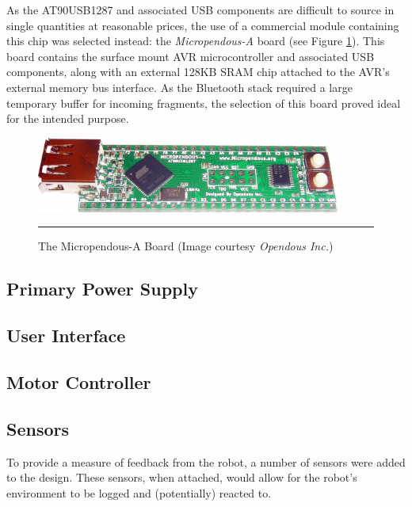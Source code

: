 As the AT90USB1287 and associated USB components are difficult to source in single quantities at reasonable prices, the use of a commercial module containing this chip was selected instead: the \textit{Micropendous-A} board (see Figure \ref{fig:micropendous}). This board contains the surface mount AVR microcontroller and associated USB components, along with an external 128KB SRAM chip attached to the AVR's external memory bus interface. As the Bluetooth stack required a large temporary buffer for incoming fragments, the selection of this board proved ideal for the intended purpose.

\begin{figure}
	\centering
		\includegraphics[width=100mm]{./Figures/MicropendousA.jpg}
	\rule{35em}{0.5pt}
	\caption[Micropendous-A Board]{The Micropendous-A Board (Image courtesy \textit{Opendous Inc.})}
	\label{fig:micropendous}
\end{figure}

\subsection{Primary Power Supply}


\subsection{User Interface}


\subsection{Motor Controller}


\subsection{Sensors}

To provide a measure of feedback from the robot, a number of sensors were added to the design. These sensors, when attached, would allow for the robot's environment to be logged and (potentially) reacted to.

